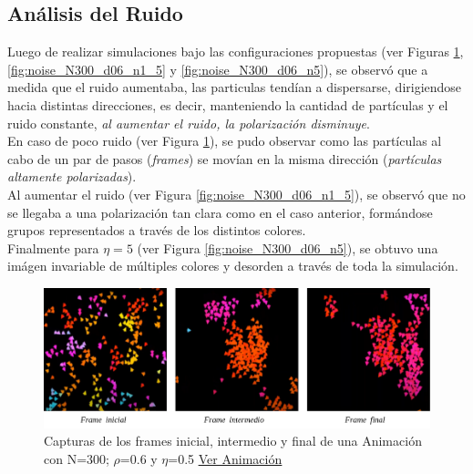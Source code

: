 \documentclass[12pt, a4paper]{report}
\begin{document}

\subsection{Análisis del Ruido}

Luego de realizar simulaciones bajo las configuraciones propuestas (ver Figuras \ref{fig:noise_N300_d06_n05}, \ref{fig:noise_N300_d06_n1_5} y \ref{fig:noise_N300_d06_n5}), se observó que a medida que el ruido aumentaba, las particulas tendían a dispersarse, dirigiendose hacia distintas direcciones, es decir, manteniendo la cantidad de partículas y el ruido constante, \emph{al aumentar el ruido, la polarización disminuye}.\\

En caso de poco ruido (ver Figura \ref{fig:noise_N300_d06_n05}), se pudo observar como las partículas al cabo de un par de pasos (\emph{frames}) se movían en la misma dirección (\emph{partículas altamente polarizadas}).\\

Al aumentar el ruido (ver Figura \ref{fig:noise_N300_d06_n1_5}), se observó que no se llegaba a una polarización tan clara como en el caso anterior, formándose grupos representados a través de los distintos colores.\\

Finalmente para $\eta = 5$ (ver Figura \ref{fig:noise_N300_d06_n5}), se obtuvo una imágen invariable de múltiples colores y desorden a través de toda la simulación.

\begin{figure}[h]
\includegraphics[scale=0.4]{noise_N300_d06_n05.png}
\centering 
\caption{Capturas de los frames inicial, intermedio y final de una Animación con N=300; $\rho$=0.6 y $\eta$=0.5 \href{https://www.youtube.com/watch?v=hD-HLrDGDrI}{\underline{Ver Animación}}} 
\label{fig:noise_N300_d06_n05}
\end{figure}
\end{document}
